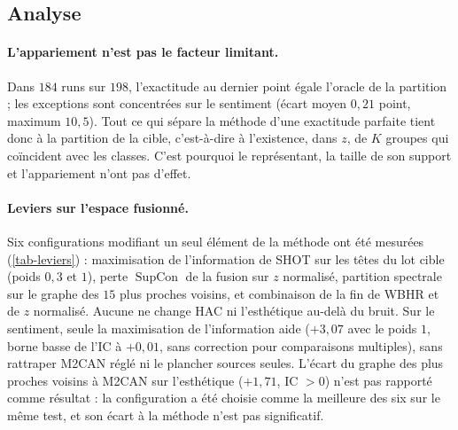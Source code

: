 \documentclass[11pt,a4paper]{article}
\theoremstyle{definition}
\theoremstyle{remark}
\DeclareMathOperator{\SupCon}{SupCon}
\begin{document}
\subsection{Analyse}\label{sec-analyse}

\paragraph{L'appariement n'est pas le facteur limitant.}
Dans $184$ runs sur $198$, l'exactitude au dernier point égale l'oracle de la partition ; les exceptions sont
concentrées sur le sentiment (écart moyen $0{,}21$ point, maximum $10{,}5$). Tout ce qui sépare la méthode d'une
exactitude parfaite tient donc à la partition de la cible, c'est-à-dire à l'existence, dans $z$, de $K$ groupes qui
coïncident avec les classes. C'est pourquoi le représentant, la taille de son support et l'appariement n'ont pas
d'effet.

\paragraph{Leviers sur l'espace fusionné.}
Six configurations modifiant un seul élément de la méthode ont été mesurées (\cref{tab-leviers}) : maximisation de
l'information de SHOT \citep{liang2020shot} sur les têtes du lot cible (poids $0{,}3$ et $1$), perte $\SupCon$ de la
fusion sur $z$ normalisé, partition spectrale sur le graphe des $15$ plus proches voisins, et combinaison de la fin de
WBHR et de $z$ normalisé. Aucune ne change HAC ni l'esthétique au-delà du bruit. Sur le sentiment, seule la maximisation
de l'information aide ($+3{,}07$ avec le poids $1$, borne basse de l'IC à $+0{,}01$, sans correction pour comparaisons
multiples), sans rattraper M2CAN réglé ni le plancher sources seules. L'écart du graphe des plus proches voisins à M2CAN
sur l'esthétique ($+1{,}71$, IC $> 0$) n'est pas rapporté comme résultat : la configuration a été choisie comme la
meilleure des six sur le même test, et son écart à la méthode n'est pas significatif.
\end{document}
